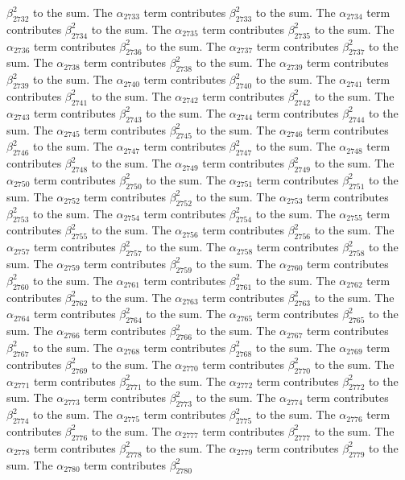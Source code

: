 \begin{lemma}
$\beta_{2732}^{2}$ to the sum. The $\alpha_{2733}$ term contributes $\beta_{2733}^{2}$ to the sum. The $\alpha_{2734}$ term contributes $\beta_{2734}^{2}$ to the sum. The $\alpha_{2735}$ term contributes $\beta_{2735}^{2}$ to the sum. The $\alpha_{2736}$ term contributes $\beta_{2736}^{2}$ to the sum. The $\alpha_{2737}$ term contributes $\beta_{2737}^{2}$ to the sum. The $\alpha_{2738}$ term contributes $\beta_{2738}^{2}$ to the sum. The $\alpha_{2739}$ term contributes $\beta_{2739}^{2}$ to the sum. The $\alpha_{2740}$ term contributes $\beta_{2740}^{2}$ to the sum. The $\alpha_{2741}$ term contributes $\beta_{2741}^{2}$ to the sum. The $\alpha_{2742}$ term contributes $\beta_{2742}^{2}$ to the sum. The $\alpha_{2743}$ term contributes $\beta_{2743}^{2}$ to the sum. The $\alpha_{2744}$ term contributes $\beta_{2744}^{2}$ to the sum. The $\alpha_{2745}$ term contributes $\beta_{2745}^{2}$ to the sum. The $\alpha_{2746}$ term contributes $\beta_{2746}^{2}$ to the sum. The $\alpha_{2747}$ term contributes $\beta_{2747}^{2}$ to the sum. The $\alpha_{2748}$ term contributes $\beta_{2748}^{2}$ to the sum. The $\alpha_{2749}$ term contributes $\beta_{2749}^{2}$ to the sum. The $\alpha_{2750}$ term contributes $\beta_{2750}^{2}$ to the sum. The $\alpha_{2751}$ term contributes $\beta_{2751}^{2}$ to the sum. The $\alpha_{2752}$ term contributes $\beta_{2752}^{2}$ to the sum. The $\alpha_{2753}$ term contributes $\beta_{2753}^{2}$ to the sum. The $\alpha_{2754}$ term contributes $\beta_{2754}^{2}$ to the sum. The $\alpha_{2755}$ term contributes $\beta_{2755}^{2}$ to the sum. The $\alpha_{2756}$ term contributes $\beta_{2756}^{2}$ to the sum. The $\alpha_{2757}$ term contributes $\beta_{2757}^{2}$ to the sum. The $\alpha_{2758}$ term contributes $\beta_{2758}^{2}$ to the sum. The $\alpha_{2759}$ term contributes $\beta_{2759}^{2}$ to the sum. The $\alpha_{2760}$ term contributes $\beta_{2760}^{2}$ to the sum. The $\alpha_{2761}$ term contributes $\beta_{2761}^{2}$ to the sum. The $\alpha_{2762}$ term contributes $\beta_{2762}^{2}$ to the sum. The $\alpha_{2763}$ term contributes $\beta_{2763}^{2}$ to the sum. The $\alpha_{2764}$ term contributes $\beta_{2764}^{2}$ to the sum. The $\alpha_{2765}$ term contributes $\beta_{2765}^{2}$ to the sum. The $\alpha_{2766}$ term contributes $\beta_{2766}^{2}$ to the sum. The $\alpha_{2767}$ term contributes $\beta_{2767}^{2}$ to the sum. The $\alpha_{2768}$ term contributes $\beta_{2768}^{2}$ to the sum. The $\alpha_{2769}$ term contributes $\beta_{2769}^{2}$ to the sum. The $\alpha_{2770}$ term contributes $\beta_{2770}^{2}$ to the sum. The $\alpha_{2771}$ term contributes $\beta_{2771}^{2}$ to the sum. The $\alpha_{2772}$ term contributes $\beta_{2772}^{2}$ to the sum. The $\alpha_{2773}$ term contributes $\beta_{2773}^{2}$ to the sum. The $\alpha_{2774}$ term contributes $\beta_{2774}^{2}$ to the sum. The $\alpha_{2775}$ term contributes $\beta_{2775}^{2}$ to the sum. The $\alpha_{2776}$ term contributes $\beta_{2776}^{2}$ to the sum. The $\alpha_{2777}$ term contributes $\beta_{2777}^{2}$ to the sum. The $\alpha_{2778}$ term contributes $\beta_{2778}^{2}$ to the sum. The $\alpha_{2779}$ term contributes $\beta_{2779}^{2}$ to the sum. The $\alpha_{2780}$ term contributes $\beta_{2780}^{2}$ 
\end{lemma}
